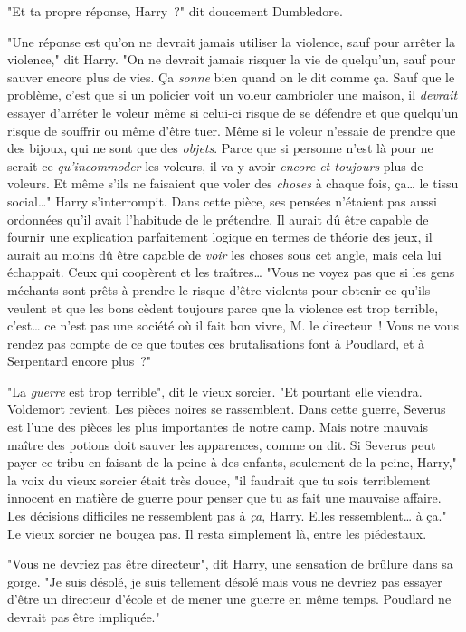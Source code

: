 "Et ta propre réponse, Harry~?" dit doucement Dumbledore.

"Une réponse est qu'on ne devrait jamais utiliser la violence, sauf pour arrêter la violence," dit Harry. "On ne devrait jamais risquer la vie de quelqu'un, sauf pour sauver encore plus de vies. Ça \emph{sonne} bien quand on le dit comme ça. Sauf que le problème, c'est que si un policier voit un voleur cambrioler une maison, il \emph{devrait} essayer d'arrêter le voleur même si celui-ci risque de se défendre et que quelqu'un risque de souffrir ou même d'être tuer. Même si le voleur n'essaie de prendre que des bijoux, qui ne sont que des \emph{objets}. Parce que si personne n'est là pour ne serait-ce \emph{qu'incommoder} les voleurs, il va y avoir \emph{encore et toujours} plus de voleurs. Et même s'ils ne faisaient que voler des \emph{choses} à chaque fois, ça… le tissu social…" Harry s'interrompit. Dans cette pièce, ses pensées n'étaient pas aussi ordonnées qu'il avait l'habitude de le prétendre. Il aurait dû être capable de fournir une explication parfaitement logique en termes de théorie des jeux, il aurait au moins dû être capable de \emph{voir} les choses sous cet angle, mais cela lui échappait. Ceux qui coopèrent et les traîtres… "Vous ne voyez pas que si les gens méchants sont prêts à prendre le risque d'être violents pour obtenir ce qu'ils veulent et que les bons cèdent toujours parce que la violence est trop terrible, c'est… ce n'est pas une société où il fait bon vivre, M. le directeur~! Vous ne vous rendez pas compte de ce que toutes ces brutalisations font à Poudlard, et à Serpentard encore plus~?"

"La \emph{guerre} est trop terrible", dit le vieux sorcier. "Et pourtant elle viendra. Voldemort revient. Les pièces noires se rassemblent. Dans cette guerre, Severus est l'une des pièces les plus importantes de notre camp. Mais notre mauvais maître des potions doit sauver les apparences, comme on dit. Si Severus peut payer ce tribu en faisant de la peine à des enfants, seulement de la peine, Harry," la voix du vieux sorcier était très douce, "il faudrait que tu sois terriblement innocent en matière de guerre pour penser que tu as fait une mauvaise affaire. Les décisions difficiles ne ressemblent pas à \emph{ça}, Harry. Elles ressemblent… à ça." Le vieux sorcier ne bougea pas. Il resta simplement là, entre les piédestaux.

"Vous ne devriez pas être directeur", dit Harry, une sensation de brûlure dans sa gorge. "Je suis désolé, je suis tellement désolé mais vous ne devriez pas essayer d'être un directeur d'école et de mener une guerre en même temps. Poudlard ne devrait pas être impliquée."

